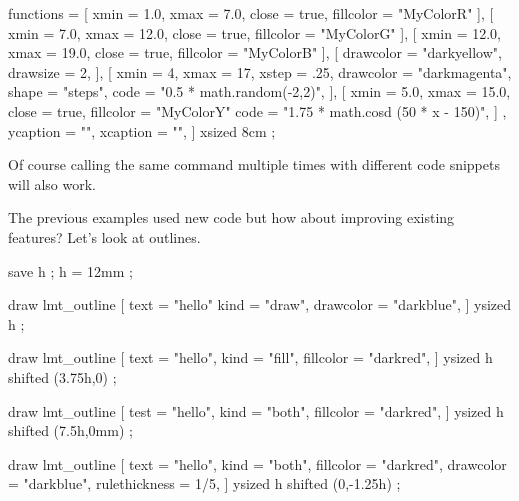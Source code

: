     functions = {
        [
            xmin      =  1.0,
            xmax      =  7.0,
            close     = true,
            fillcolor = "MyColorR"
        ],
        [
            xmin      =  7.0,
            xmax      = 12.0,
            close     = true,
            fillcolor = "MyColorG"
        ],
        [
            xmin      = 12.0,
            xmax      = 19.0,
            close     = true,
            fillcolor = "MyColorB"
        ],
        [
            drawcolor = "darkyellow",
            drawsize  = 2,
        ],
        [
            xmin      =   4,
            xmax      =  17,
            xstep     = .25,
            drawcolor = "darkmagenta",
            shape     = "steps",
            code      = "0.5 * math.random(-2,2)",
        ],
        [
            xmin      =  5.0,
            xmax      = 15.0,
            close     = true,
            fillcolor = "MyColorY"
            code      = "1.75 * math.cosd (50 * x - 150)",
        ]
    },
    ycaption  = "",
    xcaption  = "",
]
    xsized 8cm
;
\stopMPcode
\stopbuffer

\typebuffer[option=TEX]

Of course calling the same command multiple times with different code snippets
will also work.

\startlinecorrection
\getbuffer
\stoplinecorrection

The previous examples used new code but how about improving existing features?
Let's look at outlines.

\startbuffer
{}
    save h ; h = 12mm ;

    draw lmt_outline [
        text      = "hello"
        kind      = "draw",
        drawcolor = "darkblue",
    ] ysized h ;

    draw lmt_outline [
        text          = "hello",
        kind          = "fill",
        fillcolor     = "darkred",
    ] ysized h shifted (3.75h,0) ;

    draw lmt_outline [
        test          = "hello",
        kind          = "both",
        fillcolor     = "darkred",
    ] ysized h shifted (7.5h,0mm) ;

    draw lmt_outline [
        text          = "hello",
        kind          = "both",
        fillcolor     = "darkred",
        drawcolor     = "darkblue",
        rulethickness = 1/5,
    ] ysized h shifted (0,-1.25h) ;

